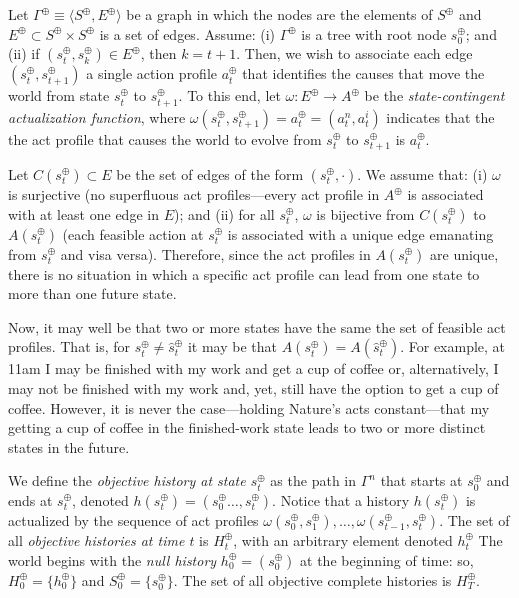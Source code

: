 \documentclass[
11pt,
titlepage,
reqno,
]{article}%
\theoremstyle{definition}
\begin{document}
	Let $\Gamma^\oplus\equiv\langle S^\oplus,E^\oplus\rangle$ be a graph in which the nodes are the elements of $S^\oplus$ and $E^\oplus\subset S^\oplus\times S^\oplus$ is a set of edges.
	Assume: (i) $\Gamma^\oplus$ is a tree with root node $s^\oplus_0$; and (ii) if $(s^\oplus_t,s^\oplus_k)\in E^\oplus$, then $k=t+1$.
	Then, we wish to associate each edge $(s^\oplus_t,s^\oplus_{t+1})$ a single action profile  $a^\oplus_t$ that identifies the causes that move the world from state $s^\oplus_t$ to $s^\oplus_{t+1}$.
	To this end, let $\omega :E^\oplus\rightarrow A^\oplus$ be the \textit{state-contingent actualization function}, where $\omega (s^\oplus_t,s^\oplus_{t+1})=a^\oplus_t=(a^n_t,a^i_t)$ indicates that the the act profile that causes the world to evolve from $s^\oplus_t$ to $s^\oplus_{t+1}$ is $a^\oplus_t$.
	
	Let $C(s^\oplus_t)\subset E$ be the set of edges of the form $(s^\oplus_t,\cdot)$.
	We assume that: (i) $\omega$ is surjective (no superfluous act profiles---every act profile in $A^\oplus$ is associated with at least one edge in $E$); and (ii)  for all $s^\oplus_t$, $\omega$ is bijective from $C(s^\oplus_t)$ to $A(s^\oplus_t)$ (each feasible action at $s^\oplus_t$ is associated with a unique edge emanating from $s^\oplus_t$ and visa versa).	
	Therefore, since the act profiles in $A(s^\oplus_t)$ are unique, there is no situation in which a specific act profile can lead from one state to more than one future state. 
	
	Now, it may well be that  two or more states have the same the set of feasible act profiles. That is, for $s^\oplus_t\ne \hat{s}^\oplus_t$ it may be that $A(s^\oplus_t)=A(\hat{s}^\oplus_t)$. For example, at 11am I may be finished with my work and get a cup of coffee or, alternatively, I may not be finished with my work and, yet, still have the option to get a cup of coffee. However, it is never the case---holding Nature's acts constant---that my getting a cup of coffee in the finished-work state leads to two or more distinct states in the future.
	
	
	We define the \textit{objective history at state $s^\oplus_t$} as the path in $\Gamma^n$ that starts at $s^\oplus_0$ and ends at $s^\oplus_t$, denoted $h(s^\oplus_t)=(s^\oplus_0\ldots,s^\oplus_t)$.
	Notice that a history $h(s^\oplus_t)$ is actualized by the sequence of act profiles $\omega(s^\oplus_0,s^\oplus_1),\ldots,\omega(s^\oplus_{t-1},s^\oplus_t)$.
	The set of all \textit{objective histories at time $t$} is $H^\oplus_t$, with an arbitrary element  denoted $h^\oplus_t$
	The world begins  with the \textit{null history} $h^\oplus_0=(s^\oplus_0)$ at the beginning of time: so, $H^\oplus_0=\{h^\oplus_0\}$ and  $S^\oplus_0=\{s^\oplus_0\}$.   
	The set of all objective complete histories is $H^\oplus_T$.
	
\end{document}
